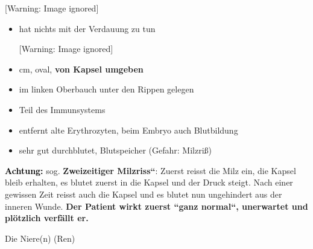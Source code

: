 \documentclass{article}
\newcommand\gEs[1]{\textbf{\textcolor[rgb]{0.0,0.0,0.5019608}{#1}}}
\newcommand\gEs[1]{\textbf{\textcolor[rgb]{0.0,0.0,0.5019608}{#1}}}
\newcommand\gCa[1]{\textbf{\textcolor{black}{#1}}}
\begin{document}
\begin{center}
 [Warning: Image ignored] %

\end{center}
\begin{itemize}
\item {\mdseries
hat nichts  mit der Verdauung  zu tun }

\begin{center}
 [Warning: Image ignored] %

\end{center}
\item { cm, oval, \gEs{von Kapsel  umgeben}}

\item {\mdseries
im linken Oberbauch unter den Rippen gelegen}

\item {\mdseries
Teil des Immunsystems}

\item {\mdseries
entfernt alte Erythrozyten, beim Embryo auch Blut\-bildung}

\item {\mdseries
sehr gut durchblutet, Blutspeicher (Gefahr:
Milzri{\ss})}

\end{itemize}
{\mdseries\color{black}
\gCa{Achtung:} sog.
\gEs{{\quotedblbase}}\gEs{Zweizeitiger
Milzriss}\gEs{{\textquotedblleft}}: Zuerst reisst
die Milz ein, die Kapsel bleib erhalten, es blutet zuerst in die Kapsel
und der Druck steigt. Nach einer gewissen Zeit reisst auch die Kapsel
und es blutet nun ungehindert aus der inneren Wunde.
\gEs{Der Patient wirkt zuerst
{\textquotedblleft}ganz normal{\textquotedblleft}, unerwartet und
pl\"otzlich verf\"allt er.} }

{\mdseries\color[rgb]{0.0,0.0,0.5019608}
Die Niere(n) (Ren)}
\end{document}
